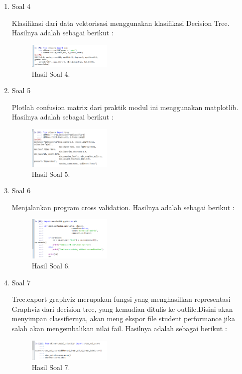 \begin{enumerate}
	\item Soal 4
	\hfill\break
	
	Klasifikasi dari data vektorisasi menggunakan klasifikasi Decision Tree. Hasilnya adalah sebagai berikut :
	\begin{figure}[H]
	\centering
		\includegraphics[width=4cm]{figures/1174071/4/materi/hasil4.PNG}
		\caption{Hasil Soal 4.}
	\end{figure}

	\item Soal 5
	\hfill\break
	
	Plotlah confusion matrix dari praktik modul ini menggunakan matplotlib. Hasilnya adalah sebagai berikut :
	\begin{figure}[H]
	\centering
		\includegraphics[width=4cm]{figures/1174071/4/materi/hasil5.PNG}
		\caption{Hasil Soal 5.}
	\end{figure}

	\item Soal 6
	\hfill\break
	
	Menjalankan program cross validation. Hasilnya adalah sebagai berikut :
	\begin{figure}[H]
	\centering
		\includegraphics[width=4cm]{figures/1174071/4/materi/hasil6.PNG}
		\caption{Hasil Soal 6.}
	\end{figure}

	\item Soal 7
	\hfill\break
	
	Tree.export graphviz merupakan fungsi yang menghasilkan representasi Graphviz dari decision tree, yang kemudian ditulis ke outfile.Disini akan menyimpan classifiernya, akan meng ekspor file student performance jika salah akan mengembalikan nilai fail. Hasilnya adalah sebagai berikut :
	\begin{figure}[H]
	\centering
		\includegraphics[width=4cm]{figures/1174071/4/materi/hasil7.PNG}
		\caption{Hasil Soal 7.}
	\end{figure}


\end{enumerate}
